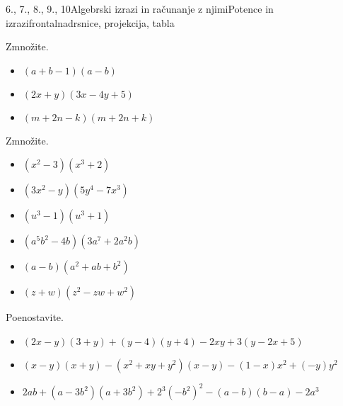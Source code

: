 \begin{priprava}{6., 7., 8., 9., 10}{}{Algebrski izrazi in računanje z njimi}{Potence in izrazi}{frontalna}{drsnice, projekcija, tabla}
\begin{multicols}{2}
\begin{naloga}
    Zmnožite.
    \begin{itemize}
        \item $(a+b-1)(a-b)$ 
        \item $(2x+y)(3x-4y+5)$ 
        \item $(m+2n-k)(m+2n+k)$ 
    \end{itemize}
\end{naloga}



\begin{naloga}
    Zmnožite.
    \begin{itemize}
        \item $(x^2-3)(x^3+2)$ 
        \item $(3x^2-y)(5y^4-7x^3)$ 
        \item $(u^3-1)(u^3+1)$ 
        \item $(a^5b^2-4b)(3a^7+2a^2b)$ 
        \item $(a-b)(a^2+ab+b^2)$ 
        \item $(z+w)(z^2-zw+w^2)$ 
    \end{itemize}
\end{naloga}



\begin{naloga}
    Poenostavite.
    \begin{itemize}
        \item $(2x-y)(3+y)+(y-4)(y+4)-2xy+3(y-2x+5)$ 
        \item $(x-y)(x+y)-(x^2+xy+y^2)(x-y)-(1-x)x^2+(-y)y^2$ 
        \item $2ab+(a-3b^2)(a+3b^2)+2^3(-b^2)^2-(a-b)(b-a)-2a^3$  
    \end{itemize}
\end{naloga}

~\\

\end{multicols}
    

\end{priprava}
